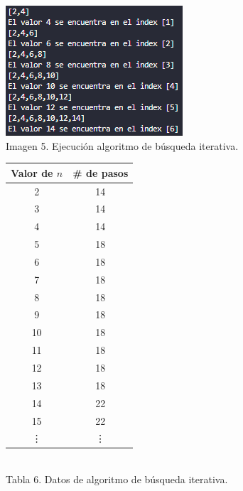 \documentclass[12pt,twoside]{article}
\begin{document}
\begin{minipage}{.45\linewidth}
  \centering
  \includegraphics[width=1\linewidth]{images/busquedaiterativa.png}
  \\
  Imagen 5. Ejecución algoritmo de búsqueda iterativa.
\end{minipage}\hfill
\begin{minipage}{.45\linewidth}
  \centering
  \begin{tabular}{|c|c|}
    \hline
    \textbf{Valor de $n$} & \textbf{\# de pasos} \\
    \hline
    2  & 14 \\
    3  & 14 \\
    4  & 14 \\
    5  & 18 \\
    6  & 18 \\
    7  & 18 \\
    8  & 18 \\
    9  & 18 \\
    10 & 18 \\
    11 & 18 \\
    12 & 18 \\
    13 & 18 \\
    14 & 22 \\
    15 & 22 \\
    \vdots & \vdots\\
    \hline
  \end{tabular}
  \\
  Tabla 6. Datos de algoritmo de búsqueda iterativa.
\end{minipage}
\par
\end{document}
